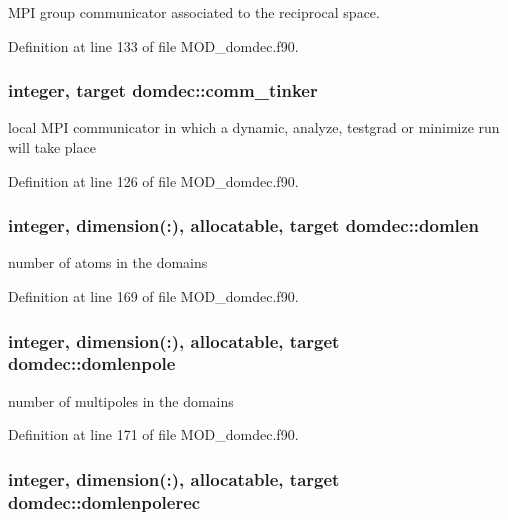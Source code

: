 M\-P\-I group communicator associated to the reciprocal space. 



Definition at line 133 of file M\-O\-D\-\_\-domdec.\-f90.

\hypertarget{classdomdec_a1c86489abc12bf273ebe35d2e95e5a97}{
\subsubsection[{comm\-\_\-tinker}]{\setlength{\rightskip}{0pt plus 5cm}integer, target domdec\-::comm\-\_\-tinker}}\label{classdomdec_a1c86489abc12bf273ebe35d2e95e5a97}


local M\-P\-I communicator in which a dynamic, analyze, testgrad or minimize run will take place 



Definition at line 126 of file M\-O\-D\-\_\-domdec.\-f90.

\hypertarget{classdomdec_a558b181b6a0bbd65a74c4525ff5de2de}{
\subsubsection[{domlen}]{\setlength{\rightskip}{0pt plus 5cm}integer, dimension(\-:), allocatable, target domdec\-::domlen}}\label{classdomdec_a558b181b6a0bbd65a74c4525ff5de2de}


number of atoms in the domains 



Definition at line 169 of file M\-O\-D\-\_\-domdec.\-f90.

\hypertarget{classdomdec_af2817bfda7f51346104df393ac0549a7}{
\subsubsection[{domlenpole}]{\setlength{\rightskip}{0pt plus 5cm}integer, dimension(\-:), allocatable, target domdec\-::domlenpole}}\label{classdomdec_af2817bfda7f51346104df393ac0549a7}


number of multipoles in the domains 



Definition at line 171 of file M\-O\-D\-\_\-domdec.\-f90.

\hypertarget{classdomdec_a44f522e557be333b75aac44b3ec5b28b}{
\subsubsection[{domlenpolerec}]{\setlength{\rightskip}{0pt plus 5cm}integer, dimension(\-:), allocatable, target domdec\-::domlenpolerec}}\label{classdomdec_a44f522e557be333b75aac44b3ec5b28b}


